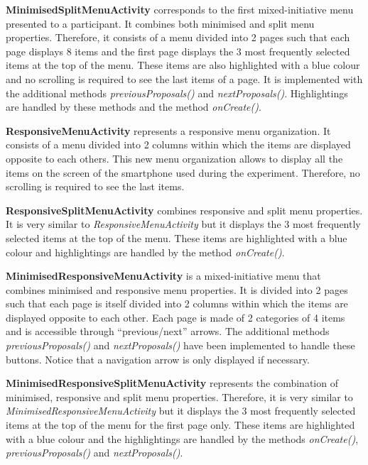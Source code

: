 \textbf{MinimisedSplitMenuActivity} corresponds to the first 
mixed-initiative menu presented to a participant. It combines both 
minimised and split menu properties. Therefore, it consists of a menu 
divided into 2 pages such that each page displays 8 items and the first 
page displays the 3 most frequently selected items at the top of the menu. 
These items are also highlighted with a blue colour and no scrolling is 
required to see the last items of a page. It is implemented with the 
additional methods \textit{previousProposals()} and 
\textit{nextProposals()}. Highlightings are handled by these methods 
and the method \textit{onCreate()}.\newline

\textbf{ResponsiveMenuActivity} represents a responsive menu 
organization. It consists of a menu divided into 2 columns within 
which the items are displayed opposite to each others. This new menu 
organization allows to display all the items on the screen of the smartphone 
used during the experiment. Therefore, no scrolling is required to see the last 
items.\newline

\textbf{ResponsiveSplitMenuActivity} combines responsive and split menu 
properties. It is very similar to \textit{ResponsiveMenuActivity} but 
it displays the 3 most frequently selected items at the top of the menu. These 
items are highlighted with a blue colour and highlightings are handled by the 
method \textit{onCreate()}.\newline

\textbf{MinimisedResponsiveMenuActivity} is a mixed-initiative menu 
that combines minimised and responsive menu properties. It is divided 
into 2 pages such that each page is itself divided into 2 columns 
within which the items are displayed opposite to each other. Each page is made 
of 2 categories of 4 items and is accessible through \enquote{previous/next} 
arrows. The additional methods \textit{previousProposals()} and 
\textit{nextProposals()} have been implemented to handle these buttons. 
Notice that a navigation arrow is only displayed if necessary.\newline

\textbf{MinimisedResponsiveSplitMenuActivity} represents the 
combination of minimised, responsive and split menu properties. 
Therefore, it is very similar to \textit{MinimisedResponsiveMenuActivity} 
but it displays the 3 most frequently selected items at the top of the menu for 
the first page only. These items are highlighted with a blue colour and the 
highlightings are handled by the methods \textit{onCreate()}, 
\textit{previousProposals()} and \textit{nextProposals()}.

